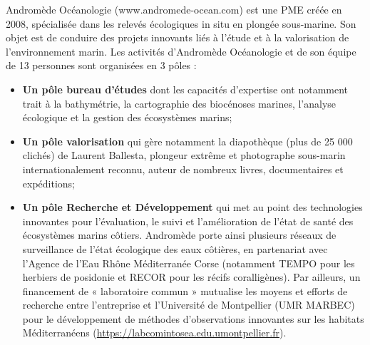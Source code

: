 Andromède Océanologie (www.andromede-ocean.com) est une PME créée en 2008, spécialisée dans les relevés écologiques in situ en plongée sous-marine. Son objet est de conduire des projets innovants liés à l'étude et à la valorisation de l'environnement marin. Les activités d’Andromède Océanologie et de son équipe de 13 personnes sont organisées en 3 pôles : 

\begin{itemize}
    \item \textbf{Un pôle bureau d’études} dont les capacités d’expertise ont notamment trait à la bathymétrie, la cartographie des biocénoses marines, l’analyse écologique et la gestion des écosystèmes marins;
    
    \item \textbf{Un pôle valorisation} qui gère notamment la diapothèque (plus de 25 000 clichés) de Laurent Ballesta, plongeur extrême et photographe sous-marin internationalement reconnu, auteur de nombreux livres, documentaires et expéditions;
    
    \item \textbf{Un pôle Recherche et Développement} qui met au point des technologies innovantes pour l’évaluation, le suivi et l’amélioration de l’état de santé des écosystèmes marins côtiers. Andromède porte ainsi plusieurs réseaux de surveillance de l’état écologique des eaux côtières, en partenariat avec l’Agence de l’Eau Rhône Méditerranée Corse (notamment TEMPO pour les herbiers de posidonie et RECOR pour les récifs coralligènes). Par ailleurs, un financement de « laboratoire commun » mutualise les moyens et efforts de recherche entre l’entreprise et l’Université de Montpellier (UMR MARBEC) pour le développement de méthodes d’observations innovantes sur les habitats Méditerranéens (\href{https://labcomintosea.edu.umontpellier.fr}{https://labcomintosea.edu.umontpellier.fr}).
\end{itemize}

